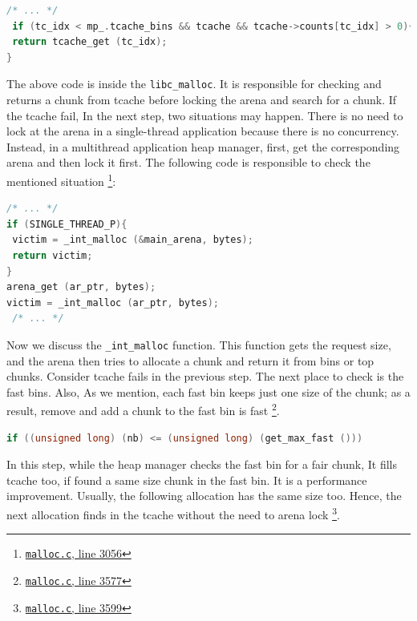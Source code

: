 \documentclass{masterthesis}
\newcommand*\tch{tcache}
\newcommand*\fb{fast bins}
\begin{document}
\begin{lstlisting}[language=c,frame=tlrb]
 /* ... */
 if (tc_idx < mp_.tcache_bins && tcache && tcache->counts[tc_idx] > 0){
 return tcache_get (tc_idx);
}
\end{lstlisting}

The above code is inside the \lstinline{libc_malloc}. It is responsible for checking and returns a chunk from \tch{} before locking the arena and search for a chunk. If the \tch{} fail, In the next step, two situations may happen. There is no need to lock at the arena in a single-thread application because there is no concurrency. Instead, in a multi\-thread application heap manager, first, get the corresponding arena and then lock it first. The following code is responsible to check the mentioned situation \footnote{\href{https://sourceware.org/git/?p=glibc.git;a=blob;f=malloc/malloc.c;h=f7cd29bc2f93e1082ee77800bd64a4b2a2897055;hb=9ea3686266dca3f004ba874745a4087a89682617\#l3056}{\texttt{malloc.c}, line 3056}}:

\begin{lstlisting}[language=c,frame=tlrb]
 /* ... */
if (SINGLE_THREAD_P){
 victim = _int_malloc (&main_arena, bytes);
 return victim;
}
arena_get (ar_ptr, bytes);
victim = _int_malloc (ar_ptr, bytes);
 /* ... */
\end{lstlisting}

Now we discuss the \lstinline{_int_malloc} function. This function gets the request size, and the arena then tries to allocate a chunk and return it from bins or top chunks. Consider \tch{} fails in the previous step. The next place to check is the \fb{}. Also, As we mention, each fast bin keeps just one size of the chunk; as a result, remove and add a chunk to the fast bin is fast \footnote{\href{https://sourceware.org/git/?p=glibc.git;a=blob;f=malloc/malloc.c;h=f7cd29bc2f93e1082ee77800bd64a4b2a2897055;hb=9ea3686266dca3f004ba874745a4087a89682617\#l3577}{\texttt{malloc.c}, line 3577}}.

\begin{lstlisting}[language=c,frame=tlrb]
if ((unsigned long) (nb) <= (unsigned long) (get_max_fast ()))
\end{lstlisting}

In this step, while the heap manager checks the fast bin for a fair chunk, It fills \tch{} too, if found a same size chunk in the fast bin. It is a performance improvement. Usually, the following allocation has the same size too. Hence, the next allocation finds in the \tch{} without the need to arena lock \footnote{\href{https://sourceware.org/git/?p=glibc.git;a=blob;f=malloc/malloc.c;h=f7cd29bc2f93e1082ee77800bd64a4b2a2897055;hb=9ea3686266dca3f004ba874745a4087a89682617\#l3599}{\texttt{malloc.c}, line 3599}}.
\end{document}
